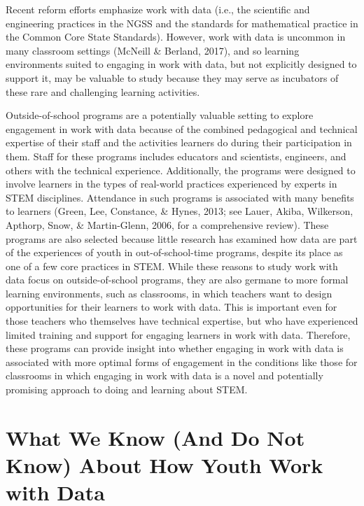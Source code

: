 \documentclass[]{msu-thesis}
\theoremstyle{definition}
\theoremstyle{definition}
\theoremstyle{definition}
\theoremstyle{remark}
\begin{document}
Recent reform efforts emphasize work with data (i.e., the scientific and
engineering practices in the NGSS and the standards for mathematical
practice in the Common Core State Standards). However, work with data is
uncommon in many classroom settings (McNeill \& Berland, 2017), and so
learning environments suited to engaging in work with data, but not
explicitly designed to support it, may be valuable to study because they
may serve as incubators of these rare and challenging learning
activities.

Outside-of-school programs are a potentially valuable setting to explore
engagement in work with data because of the combined pedagogical and
technical expertise of their staff and the activities learners do during
their participation in them. Staff for these programs includes educators
and scientists, engineers, and others with the technical experience.
Additionally, the programs were designed to involve learners in the
types of real-world practices experienced by experts in STEM
disciplines. Attendance in such programs is associated with many
benefits to learners (Green, Lee, Constance, \& Hynes, 2013; see Lauer,
Akiba, Wilkerson, Apthorp, Snow, \& Martin-Glenn, 2006, for a
comprehensive review). These programs are also selected because little
research has examined how data are part of the experiences of youth in
out-of-school-time programs, despite its place as one of a few core
practices in STEM. While these reasons to study work with data focus on
outside-of-school programs, they are also germane to more formal
learning environments, such as classrooms, in which teachers want to
design opportunities for their learners to work with data. This is
important even for those teachers who themselves have technical
expertise, but who have experienced limited training and support for
engaging learners in work with data. Therefore, these programs can
provide insight into whether engaging in work with data is associated
with more optimal forms of engagement in the conditions like those for
classrooms in which engaging in work with data is a novel and
potentially promising approach to doing and learning about STEM.

\section{What We Know (And Do Not Know) About How Youth Work with
Data}\label{what-we-know-and-do-not-know-about-how-youth-work-with-data}
\end{document}
